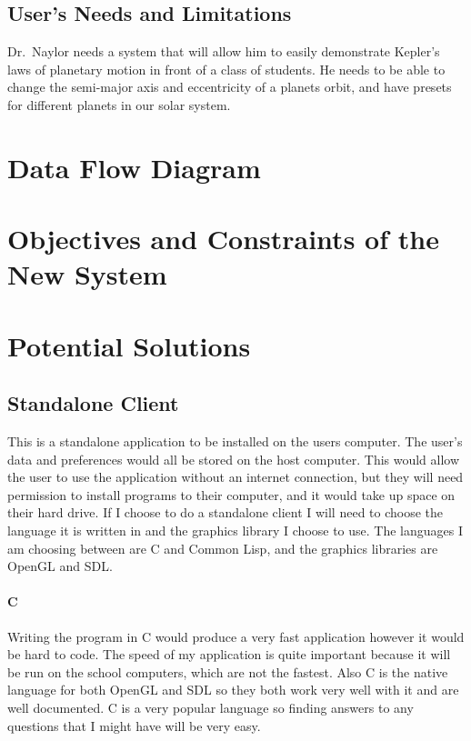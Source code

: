 \subsection{User's Needs and Limitations} 
Dr.~Naylor needs a system that will allow him to easily demonstrate Kepler's
laws of planetary motion in front of a class of students. He needs to be able
to change the semi-major axis and eccentricity of a planets orbit, and have
presets for different planets in our solar system. 

\section{Data Flow Diagram}

\section{Objectives and Constraints of the New System}


\section{Potential Solutions}

\subsection{Standalone Client}
This is a standalone application to be installed on the users computer. The
user's data and preferences would all be stored on the host computer. This would
allow the user to use the application without an internet connection, but they
will need permission to install programs to their computer, and it would take up
space on their hard drive. If I choose to do a standalone client I will need to
choose the language it is written in and the graphics library I choose to use.
The languages I am choosing between are C and Common Lisp, and the graphics
libraries are OpenGL and SDL.

\paragraph{C}
Writing the program in C would produce a very fast application however it would
be hard to code. The speed of my application is quite important because it will
be run on the school computers, which are not the fastest. Also C is the native
language for both OpenGL and SDL so they both work very well with it and are
well documented. C is a very popular language so finding answers to any
questions that I might have will be very easy.

